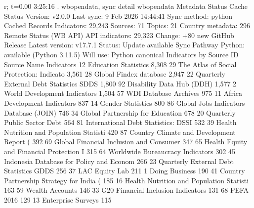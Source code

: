 r; t=0.00 3:25:16
{\smallskip}
. wbopendata, sync detail
{\smallskip}
wbopendata Metadata Status
{\smallskip}
  Cache Status
  Version:          v2.0.0
  Last sync:        9 Feb 2026 14:44:41
  Sync method:      python
{\smallskip}
  Cached Records
  Indicators:          29,243
  Sources:                 71
  Topics:                  21
  Country metadata:       296
{\smallskip}
  Remote Status (WB API)
  API indicators:      29,323
  Change:           +80 new
{\smallskip}
  GitHub Release
  Latest version:   v17.7.1
  Status:           Update available
{\smallskip}
  Sync Pathway
  Python:           available (Python 3.11.5)
  Will use:         Python canonical
{\smallskip}
  Indicators by Source
{\smallskip}
   ID    Source Name                                  Indicators
   12    Education Statistics                            8,308
   29    The Atlas of Social Protection: Indicato        3,561
   28    Global Findex database                          2,947
   22    Quarterly External Debt Statistics SDDS         1,800
   92    Disability Data Hub (DDH)                       1,577
   2     World Development Indicators                    1,504
   57    WDI Database Archives                             975
   11    Africa Development Indicators                     837
   14    Gender Statistics                                 800
   86    Global Jobs Indicators Database (JOIN)            746
   34    Global Partnership for Education                  678
   20    Quarterly Public Sector Debt                      564
   81     International Debt Statistics: DSSI              532
   39    Health Nutrition and Population Statisti          420
   87    Country Climate and Development Report (          392
   69    Global Financial Inclusion and Consumer           347
   65    Health Equity and Financial Protection I          315
   64    Worldwide Bureaucracy Indicators                  302
   45    Indonesia Database for Policy and Econom          266
   23    Quarterly External Debt Statistics GDDS           256
   37    LAC Equity Lab                                    211
   1     Doing Business                                    190
   41    Country Partnership Strategy for India (          185
   16    Health Nutrition and Population Statisti          163
   59    Wealth Accounts                                   146
   33    G20 Financial Inclusion Indicators                131
   68    PEFA 2016                                         129
   13    Enterprise Surveys                                115
